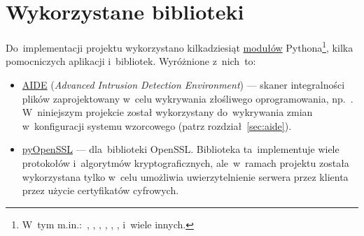 \documentclass[thesis]{subfiles}
\begin{document}

\section{Wykorzystane biblioteki}
\label{sec:wykorzystane-oprogramowanie}

Do~implementacji projektu wykorzystano kilkadziesiąt \href{https://docs.python.org/dev/tutorial/modules.html}{modułów} Pythona\footnote{W~tym m.in.:~, , , , , ,  i~wiele innych.}, kilka pomocniczych aplikacji i~bibliotek. Wyróżnione z~nich~to:\mynobreakpar
\begin{itemize}
	\item \href{http://aide.sourceforge.net/}{AIDE} (\emph{Advanced Intrusion Detection Environment}) --- skaner integralności plików zaprojektowany w~celu wykrywania złośliwego oprogramowania, np.~. W~niniejszym projekcie został wykorzystany do~wykrywania zmian w~konfiguracji systemu wzorcowego (patrz rozdział~\ref{sec:aide}).
	\item \href{http://www.pyopenssl.org/}{pyOpenSSL} ---  dla~biblioteki OpenSSL. Biblioteka ta~implementuje wiele protokołów i~algorytmów kryptograficznych, ale~w~ramach projektu została wykorzystana tylko w~celu umożliwia uwierzytelnienie serwera przez klienta przez użycie certyfikatów cyfrowych.
\end{itemize}
\end{document}
